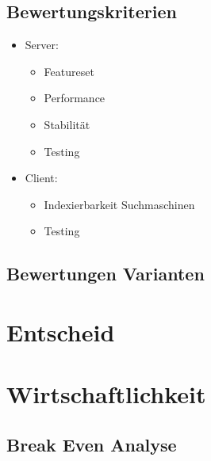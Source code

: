 \subsection{Bewertungskriterien}\label{bewertungskriterien}

\begin{itemize}
  \tightlist
  \item
        Server:
        \begin{itemize}
          \tightlist
          \item
                Featureset
          \item
                Performance
          \item
                Stabilität
          \item
                Testing
        \end{itemize}
\end{itemize}

\begin{itemize}
  \tightlist
  \item
        Client:
        \begin{itemize}
          \tightlist
          \item
                Indexierbarkeit Suchmaschinen
          \item
                Testing
        \end{itemize}
\end{itemize}

\subsection{Bewertungen Varianten}\label{bewertungen-varianten}

\section{Entscheid}\label{entscheid}

\section{Wirtschaftlichkeit}\label{wirtschaftlichkeit}

\subsection{Break Even Analyse}\label{break-even-analyse}
